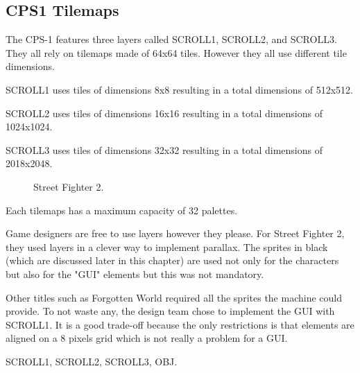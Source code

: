 



\subsection{CPS1 Tilemaps}
The CPS-1 features three layers called SCROLL1, SCROLL2, and SCROLL3. They all rely on tilemaps made of 64x64 tiles. However they all use different tile dimensions. 

SCROLL1 uses tiles of dimensions 8x8 resulting in a total dimensions of 512x512.

SCROLL2 uses tiles of dimensions 16x16 resulting in a total dimensions of 1024x1024.

SCROLL3 uses tiles of dimensions 32x32 resulting in a total dimensions of 2018x2048.


\vfill
\begin{figure}[!b]
 \caption*{Street Fighter 2.}%
 \end{figure}%
\pagebreak

Each tilemaps has a maximum capacity of 32 palettes.


Game designers are free to use layers however they please. For Street Fighter 2, they used layers in a clever way to implement parallax. The sprites in black (which are discussed later in this chapter) are used not only for the characters but also for the "GUI" elements but this was not mandatory.

Other titles such as Forgotten World required all the sprites the machine could provide. To not waste any, the design team chose to implement the GUI with SCROLL1. It is a good trade-off because the only restrictions is that elements are aligned on a 8 pixels grid which is not really a problem for a GUI.

 SCROLL1,  SCROLL2,  SCROLL3,  OBJ.

